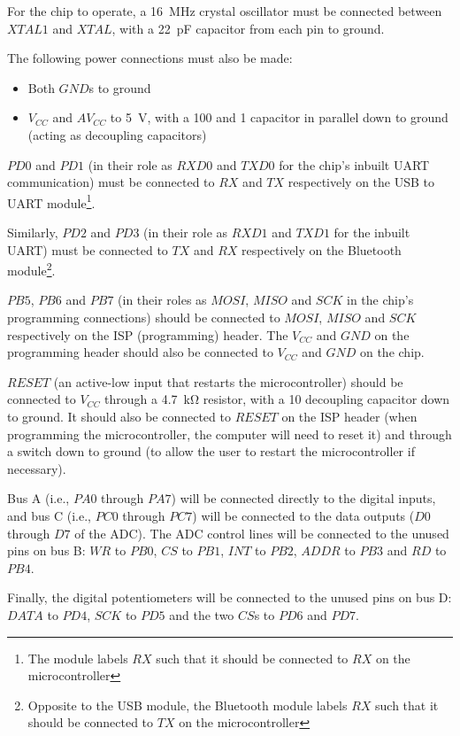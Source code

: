 For the chip to operate, a \SI{16}{\MHz} crystal oscillator must be connected
between $XTAL1$ and $XTAL$, with a \SI{22}{\pF} capacitor from each pin to
ground.

The following power connections must also be made:
\begin{itemize}
  \item Both $GND$s to ground
  \item $V_{CC}$ and $AV_{CC}$ to \SI{5}{\volt}, with a \SI{100}{\nF} and \SI{1}{\uF}
    capacitor in parallel down to ground (acting as decoupling capacitors)
\end{itemize}

$PD0$ and $PD1$ (in their role as $RXD0$ and $TXD0$ for the chip's inbuilt UART
communication) must be connected to $RX$ and $TX$ respectively on the USB to
UART module\footnote{The module labels $RX$ such that it should be connected to
$RX$ on the microcontroller}.

Similarly, $PD2$ and $PD3$ (in their role as $RXD1$ and $TXD1$ for the inbuilt
UART) must be connected to $TX$ and $RX$ respectively on the Bluetooth
module\footnote{Opposite to the USB module, the Bluetooth module labels $RX$
such that it should be connected to $TX$ on the microcontroller}.

$PB5$, $PB6$ and $PB7$ (in their roles as $MOSI$, $MISO$ and $SCK$ in the chip's
programming connections) should be connected to $MOSI$, $MISO$ and $SCK$
respectively on the ISP (programming) header. The $V_{CC}$ and $GND$ on the
programming header should also be connected to $V_{CC}$ and $GND$ on the chip.

$RESET$ (an active-low input that restarts the microcontroller) should be
connected to $V_{CC}$ through a \SI{4.7}{\kilo\ohm} resistor, with a
\SI{10}{\nF} decoupling capacitor down to ground. It should also be connected to
$RESET$ on the ISP header (when programming the microcontroller, the computer
will need to reset it) and through a switch down to ground (to allow the user to
restart the microcontroller if necessary).

Bus A (i.e., $PA0$ through $PA7$) will be connected directly to the digital
inputs, and bus C (i.e., $PC0$ through $PC7$) will be connected to the data
outputs ($D0$ through $D7$ of the ADC). The ADC control lines will be connected
to the unused pins on bus B: $WR$ to $PB0$, $CS$ to $PB1$, $INT$ to $PB2$,
$ADDR$ to $PB3$ and $RD$ to $PB4$.

Finally, the digital potentiometers will be connected to the unused pins on bus
D: $DATA$ to $PD4$, $SCK$ to $PD5$ and the two $CS$s to $PD6$ and $PD7$.

